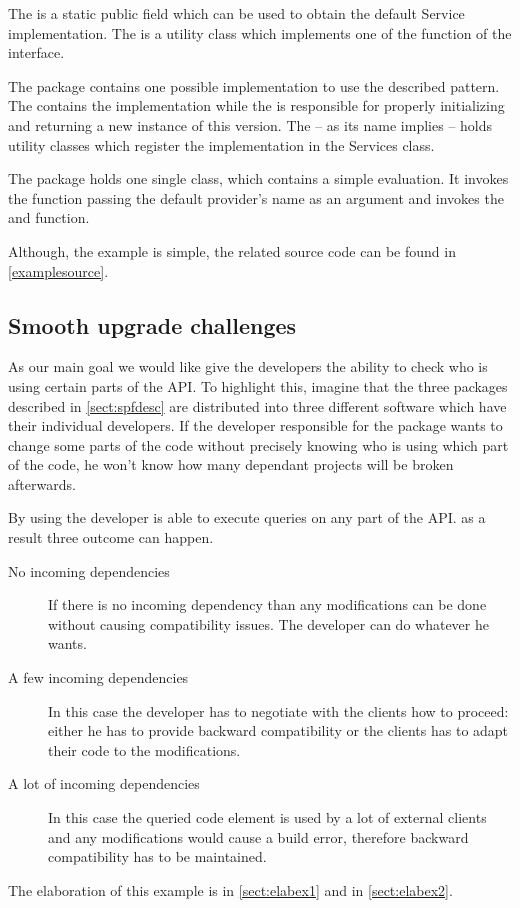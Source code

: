 The  is a static public field which can be used to
obtain the default Service implementation. The  is a
utility class which implements one of the function of the  interface.

The  package contains one possible implementation to use the
described pattern. The  contains the implementation while the
 is responsible for properly initializing and returning a
new instance of this version. The  -- as its name implies --
holds utility classes which register the implementation in the Services class.

The  package holds one single  class, which contains a
simple evaluation. It invokes the  function passing
the default provider's name as an argument and invokes the  and
 function.

Although, the example is simple, the related source code can be found in
\autoref{examplesource}.

\subsection{Smooth upgrade challenges}
As our main goal we would like give the developers the ability to check who is
using certain parts of the API. To highlight this, imagine that the three
packages described in \autoref{sect:spfdesc} are distributed into three
different software which have their individual developers. If the developer
responsible for the  package wants to change some parts of the
code without precisely knowing who is using which part of the code, he won't
know how many dependant projects will be broken afterwards. 

By using \ptool{} the developer is able to execute queries on any part of the
API. as a result three outcome can happen.
\begin{description}
  \item[No incoming dependencies] If there is no incoming dependency than any modifications can be done without
causing compatibility issues. The developer can do whatever he wants.
  \item[A few incoming dependencies] In this case the developer has to negotiate
with the clients how to proceed: either he has to provide backward compatibility or the
clients has to adapt their code to the modifications.
  \item[A lot of incoming dependencies] In this case the queried code
element is used by a lot of external clients and any modifications would cause a build
error, therefore backward compatibility has to be maintained.
\end{description}
The elaboration of this example is in \autoref{sect:elabex1} and in \autoref{sect:elabex2}.